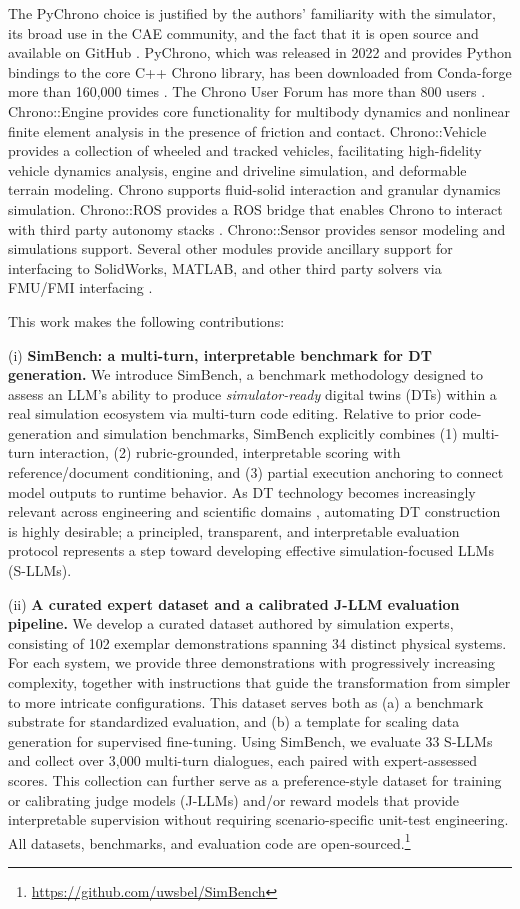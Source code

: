 The PyChrono choice is justified by the authors' familiarity with the simulator, its broad use in the CAE community, and the fact that it is open source and available on GitHub \cite{projectChronoGithub,projectChronoWebSite}. PyChrono, which was released in 2022 and provides Python bindings to the core C++ Chrono library, has been downloaded from Conda-forge more than 160,000 times \cite{chronodownload}. The Chrono User Forum has more than 800 users \cite{projectChronoForum}. Chrono::Engine provides core functionality for multibody dynamics and nonlinear finite element analysis in the presence of friction and contact. Chrono::Vehicle provides a collection of wheeled and tracked vehicles, facilitating high-fidelity vehicle dynamics analysis, engine and driveline simulation, and deformable terrain modeling. Chrono supports fluid-solid interaction and granular dynamics simulation. Chrono::ROS provides a ROS bridge that enables Chrono to interact with third party autonomy stacks \cite{ROS-2009}. Chrono::Sensor provides sensor modeling and simulations support. Several other modules provide ancillary support for interfacing to SolidWorks, MATLAB, and other third party solvers via FMU/FMI interfacing \cite{FMI_3.0}.

This work makes the following contributions:

(i) \textbf{SimBench: a multi-turn, interpretable benchmark for DT generation.} We introduce SimBench, a benchmark methodology designed to assess an LLM's ability to produce \emph{simulator-ready} digital twins (DTs) within a real simulation ecosystem via multi-turn code editing. Relative to prior code-generation and simulation benchmarks, SimBench explicitly combines (1) multi-turn interaction, (2) rubric-grounded, interpretable scoring with reference/document conditioning, and (3) partial execution anchoring to connect model outputs to runtime behavior. As DT technology becomes increasingly relevant across engineering and scientific domains \cite{digitalTwinReportNAcademies2023}, automating DT construction is highly desirable; a principled, transparent, and interpretable evaluation protocol represents a step toward developing effective simulation-focused LLMs (S-LLMs).

(ii) \textbf{A curated expert dataset and a calibrated J-LLM evaluation pipeline.} We develop a curated dataset authored by simulation experts, consisting of 102 exemplar demonstrations spanning 34 distinct physical systems. For each system, we provide three demonstrations with progressively increasing complexity, together with instructions that guide the transformation from simpler to more intricate configurations. This dataset serves both as (a) a benchmark substrate for standardized evaluation, and (b) a template for scaling data generation for supervised fine-tuning. Using SimBench, we evaluate 33 S-LLMs and collect over 3{,}000 multi-turn dialogues, each paired with expert-assessed scores. This collection can further serve as a preference-style dataset for training or calibrating judge models (J-LLMs) and/or reward models that provide interpretable supervision without requiring scenario-specific unit-test engineering. All datasets, benchmarks, and evaluation code are open-sourced.\footnote{\url{https://github.com/uwsbel/SimBench}}


